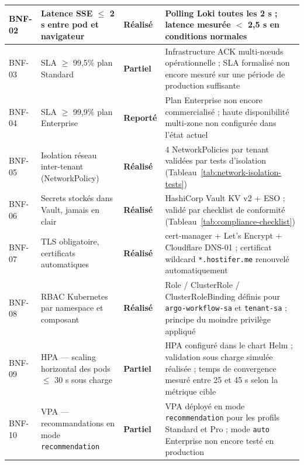 \begin{longtable}{|p{0.8cm}|p{5.5cm}|p{2.2cm}|p{4.5cm}|}
BNF-02
  & Latence SSE $\leq$ 2 s entre pod et navigateur
  & \textcolor{green!60!black}{\textbf{Réalisé}}
  & Polling Loki toutes les 2 s ; latence mesurée $<$ 2,5 s en conditions normales \\
\hline

BNF-03
  & SLA $\geq$ 99,5\% plan Standard
  & \textcolor{orange!80!black}{\textbf{Partiel}}
  & Infrastructure ACK multi-nœuds opérationnelle ; SLA formalisé non encore mesuré sur une période de production suffisante \\
\hline

BNF-04
  & SLA $\geq$ 99,9\% plan Enterprise
  & \textcolor{red!70!black}{\textbf{Reporté}}
  & Plan Enterprise non encore commercialisé ; haute disponibilité multi-zone non configurée dans l'état actuel \\
\hline

BNF-05
  & Isolation réseau inter-tenant (NetworkPolicy)
  & \textcolor{green!60!black}{\textbf{Réalisé}}
  & 4 NetworkPolicies par tenant validées par tests d'isolation (Tableau~\ref{tab:network-isolation-tests}) \\
\hline

BNF-06
  & Secrets stockés dans Vault, jamais en clair
  & \textcolor{green!60!black}{\textbf{Réalisé}}
  & HashiCorp Vault KV v2 + ESO ; validé par checklist de conformité (Tableau~\ref{tab:compliance-checklist}) \\
\hline

BNF-07
  & TLS obligatoire, certificats automatiques
  & \textcolor{green!60!black}{\textbf{Réalisé}}
  & cert-manager + Let's Encrypt + Cloudflare DNS-01 ; certificat wildcard \texttt{*.hostifer.me} renouvelé automatiquement \\
\hline

BNF-08
  & RBAC Kubernetes par namespace et composant
  & \textcolor{green!60!black}{\textbf{Réalisé}}
  & Role / ClusterRole / ClusterRoleBinding définis pour \texttt{argo-workflow-sa} et \texttt{tenant-sa} ; principe du moindre privilège appliqué \\
\hline

BNF-09
  & HPA — scaling horizontal des pods $\leq$ 30 s sous charge
  & \textcolor{orange!80!black}{\textbf{Partiel}}
  & HPA configuré dans le chart Helm ; validation sous charge simulée réalisée ; temps de convergence mesuré entre 25 et 45 s selon la métrique cible \\
\hline

BNF-10
  & VPA — recommandations en mode \texttt{recommendation}
  & \textcolor{orange!80!black}{\textbf{Partiel}}
  & VPA déployé en mode \texttt{recommendation} pour les profils Standard et Pro ; mode \texttt{auto} Enterprise non encore testé en production \\
\hline


\end{longtable}
